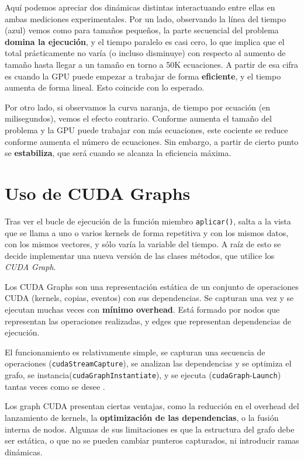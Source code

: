 Aquí podemos apreciar dos dinámicas distintas interactuando entre ellas en ambas mediciones experimentales. Por un lado, observando la línea del tiempo (azul) vemos como para tamaños pequeños, la parte secuencial del problema \textbf{domina la ejecución}, y el tiempo paralelo es casi cero, lo que implica que el total prácticamente no varía (o incluso disminuye) con respecto al aumento de tamaño hasta llegar a un tamaño en torno a 50K ecuaciones. A partir de esa cifra es cuando la GPU puede empezar a trabajar de forma \textbf{eficiente}, y el tiempo aumenta de forma lineal. Esto coincide con lo esperado.

Por otro lado, si observamos la curva naranja, de tiempo por ecuación (en milisegundos), vemos el efecto contrario. Conforme aumenta el tamaño del problema y la GPU puede trabajar con más ecuaciones, este cociente se reduce conforme aumenta el número de ecuaciones. Sin embargo, a partir de cierto punto se \textbf{estabiliza}, que será cuando se alcanza la eficiencia máxima.

\section{Uso de CUDA Graphs}

Tras ver el bucle de ejecución de la función miembro \texttt{aplicar()}, salta a la vista que se llama a uno o varios kernels de forma repetitiva y con los mismos datos, con los mismos vectores, y sólo varía la variable del tiempo. A raíz de esto se decide implementar una nueva versión de las clases métodos, que utilice los \textit{CUDA Graph}. 

Los CUDA Graphs son una representación estática de un conjunto de operaciones CUDA (kernels, copias, eventos) con sus dependencias. \cite{Barlas2023} Se capturan una vez y se ejecutan muchas veces con \textbf{mínimo overhead}. Está formado por nodos que representan las operaciones realizadas, y edges que representan dependencias de ejecución.

El funcionamiento es relativamente simple, se capturan una secuencia de operaciones (\texttt{cudaStreamCapture}), se analizan las dependencias y se optimiza el grafo, se instancia(\texttt{cudaGraphInstantiate}), y se ejecuta (\texttt{cudaGraph}-\texttt{Launch}) tantas veces como se desee \cite{NVIDIA2026}.

Los graph CUDA presentan ciertas ventajas, como la reducción en el overhead del lanzamiento de kernels, la \textbf{optimización de las dependencias}, o la fusión interna de nodos. Algunas de sus limitaciones es que la estructura del grafo debe ser estática, o que no se pueden cambiar punteros capturados, ni introducir ramas dinámicas.

